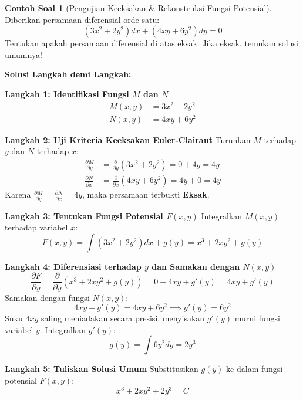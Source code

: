 \documentclass[11pt,a4paper]{article}
\theoremstyle{definition}
\newtheorem{example}{Contoh Soal}[section]
\begin{document}
\begin{example}[Pengujian Keeksakan \& Rekonstruksi Fungsi Potensial]
Diberikan persamaan diferensial orde satu:
\begin{equation}
    (3x^2 + 2y^2) dx + (4xy + 6y^2) dy = 0
\end{equation}
Tentukan apakah persamaan diferensial di atas eksak. Jika eksak, temukan solusi umumnya!

\textbf{Solusi Langkah demi Langkah:}

\textbf{Langkah 1: Identifikasi Fungsi $M$ dan $N$}
\begin{align}
    M(x,y) &= 3x^2 + 2y^2 \\
    N(x,y) &= 4xy + 6y^2
\end{align}

\textbf{Langkah 2: Uji Kriteria Keeksakan Euler-Clairaut}
Turunkan $M$ terhadap $y$ dan $N$ terhadap $x$:
\begin{align}
    \frac{\partial M}{\partial y} &= \frac{\partial}{\partial y}(3x^2 + 2y^2) = 0 + 4y = 4y \\
    \frac{\partial N}{\partial x} &= \frac{\partial}{\partial x}(4xy + 6y^2) = 4y + 0 = 4y
\end{align}
Karena $\frac{\partial M}{\partial y} = \frac{\partial N}{\partial x} = 4y$, maka persamaan terbukti \textbf{Eksak}.

\textbf{Langkah 3: Tentukan Fungsi Potensial $F(x,y)$}
Integralkan $M(x,y)$ terhadap variabel $x$:
\begin{equation}
    F(x,y) = \int (3x^2 + 2y^2) dx + g(y) = x^3 + 2x y^2 + g(y)
\end{equation}

\textbf{Langkah 4: Diferensiasi terhadap $y$ dan Samakan dengan $N(x,y)$}
\begin{equation}
    \frac{\partial F}{\partial y} = \frac{\partial}{\partial y}(x^3 + 2x y^2 + g(y)) = 0 + 4xy + g'(y) = 4xy + g'(y)
\end{equation}
Samakan dengan fungsi $N(x,y)$:
\begin{equation}
    4xy + g'(y) = 4xy + 6y^2 \implies g'(y) = 6y^2
\end{equation}
Suku $4xy$ saling meniadakan secara presisi, menyisakan $g'(y)$ murni fungsi variabel $y$. Integralkan $g'(y)$:
\begin{equation}
    g(y) = \int 6y^2 dy = 2y^3
\end{equation}

\textbf{Langkah 5: Tuliskan Solusi Umum}
Substitusikan $g(y)$ ke dalam fungsi potensial $F(x,y)$:
\begin{equation}
    x^3 + 2xy^2 + 2y^3 = C
\end{equation}
\end{example}
\end{document}
